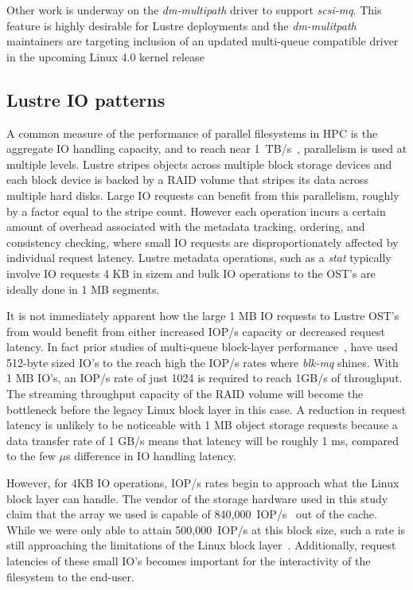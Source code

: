 \documentclass[conference]{IEEEtran}
\begin{document}
Other work is underway on the \emph{dm-multipath} driver to support \emph{scsi-mq}. This feature is highly desirable for Lustre deployments and the
\emph{dm-mulitpath} maintainers are targeting inclusion of an updated multi-queue compatible driver in the upcoming Linux 4.0 kernel release

\subsection{Lustre IO patterns}
\label{sec:lustre-io}
A common measure of the performance of parallel filesystems in HPC is the
aggregate IO handling capacity, and to reach near 1~TB/s~\cite{sc14-spider}, parallelism is used at multiple levels.
Lustre stripes objects across multiple block storage devices \cite{www:lustre}
and each block device is backed by a RAID volume that stripes its data across multiple
hard disks. Large IO requests can benefit from this parallelism, roughly by a
factor equal to the stripe count. However each
operation incurs a certain amount of overhead associated with the metadata
tracking, ordering, and consistency checking, where small IO requests are
disproportionately affected by individual request latency. Lustre metadata operations,
such as a \emph{stat} typically involve IO requests 4 KB in sizem
and bulk IO operations to the OST's are ideally done
in 1 MB segments.

It is not immediately apparent how the large 1 MB IO requests to Lustre OST's 
from would benefit from either increased IOP/s capacity or decreased request
latency. In fact prior studies of multi-queue block-layer performance~\cite{bjorling13, www:scsimq:v2}, have used
512-byte sized IO's to the reach high the IOP/s rates where \emph{blk-mq} shines. With 1 MB IO's, an IOP/s rate of just 1024
is required to reach 1GB/s of throughput. The streaming throughput capacity of the RAID volume will become the bottleneck before the 
legacy Linux block layer in this case. A reduction in request latency is unlikely to be noticeable
with 1 MB object storage requests because a data transfer rate of 1 GB/s means that latency will be roughly 1 ms, compared
to the few $\mu$s difference in IO handling latency.

However, for 4KB IO operations, IOP/s rates begin to approach what the Linux block
layer can handle. The vendor of the storage
hardware used in this study claim that the array we used is capable of 840,000~IOP/s~\cite{ddn10k} out of the cache.
While we were only able to attain 500,000~IOP/s at this block size,
such a rate is still approaching the limitations of the Linux block layer~\cite{bjorling13}. Additionally, request latencies of
these small IO's becomes important for the interactivity of the filesystem to the end-user.
\end{document}
